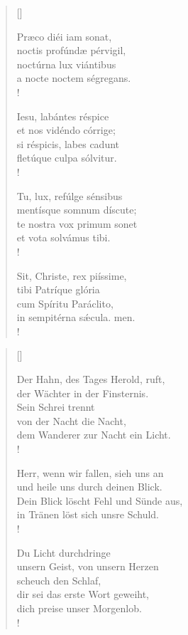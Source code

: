 {\setlength{\columnsep}{0.5cm}

\begin{multicols}{2}
\begin{verse}[\versewidth]
 

{\small{ Præco diéi iam sonat, \\
noctis profúndæ pérvigil, \\
noctúrna lux viántibus\\
a nocte noctem ségregans.\\!

 Iesu, labántes réspice\\
et nos vidéndo córrige;\\
si réspicis, labes cadunt\\
fletúque culpa sólvitur.\\!

 Tu, lux, refúlge sénsibus\\
mentísque somnum díscute;\\
te nostra vox primum sonet\\
et vota solvámus tibi.\\!

 Sit, Christe, rex piíssime, \\
tibi Patríque glória\\
cum Spíritu Paráclito,\\ 
in sempitérna s\'{æ}cula. men.\\!}}

\end{verse}

\columnbreak
 
\begin{verse}[\versewidth]
 
{\footnotesize\rm{ Der Hahn, des Tages Herold, ruft,\\
der Wächter in der Finsternis.\\
Sein Schrei trennt\\
von der Nacht die Nacht,\\
dem Wanderer zur Nacht ein Licht.\\!

 Herr, wenn wir fallen, sieh uns an\\
und heile uns durch deinen Blick.\\
Dein Blick löscht Fehl und Sünde aus,\\
in Tränen löst sich unsre Schuld.\\!

 Du Licht durchdringe\\
unsern Geist, von unsern Herzen\\
scheuch den Schlaf,\\
dir sei das erste Wort geweiht,\\
dich preise unser Morgenlob.\\!

}}
\end{verse}
\end{multicols}}
